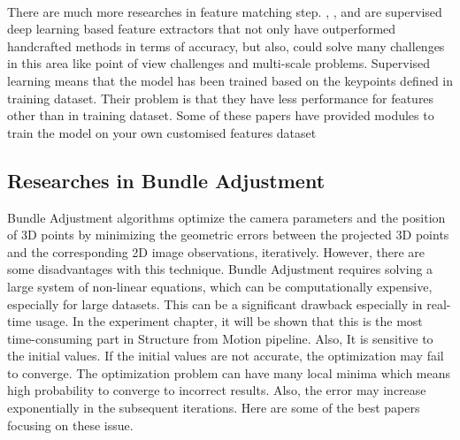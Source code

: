 \documentclass[11pt]{article}
\begin{document}
    \paragraph{} There are much more researches in feature matching step. \cite{revaud2019r2d2}, \cite{dusmanu2019d2net},
    and \cite{detone2018superpoint} are supervised deep learning based feature extractors that not only have
    outperformed handcrafted methods in terms of accuracy, but also, could solve many challenges in this area like
    point of view challenges and multi-scale problems. Supervised learning means that the model has been trained
    based on the keypoints defined in training dataset. Their problem is that they have less performance for features other
    than in training dataset. Some of these papers have provided modules to train the model on your own customised features dataset

    \newpage
    \subsection{Researches in Bundle Adjustment}
    Bundle Adjustment algorithms optimize the camera parameters and the position of 3D points by minimizing the
    geometric errors between the projected 3D points and the corresponding 2D image observations, iteratively. However, there
    are some disadvantages with this technique. Bundle Adjustment requires solving a large system of
    non-linear equations, which can be computationally expensive, especially for large datasets. This can be a
    significant drawback especially in real-time usage. In the experiment chapter, it will be shown that this is the most time-consuming part in Structure from Motion pipeline.
    Also, It is sensitive to the initial values. If the initial values are not accurate, the optimization may fail to converge.
    The optimization problem can have many local minima which means high probability to converge to incorrect results.
    Also, the error may increase exponentially in the subsequent iterations. Here are some of the best papers focusing on these issue.
\end{document}
